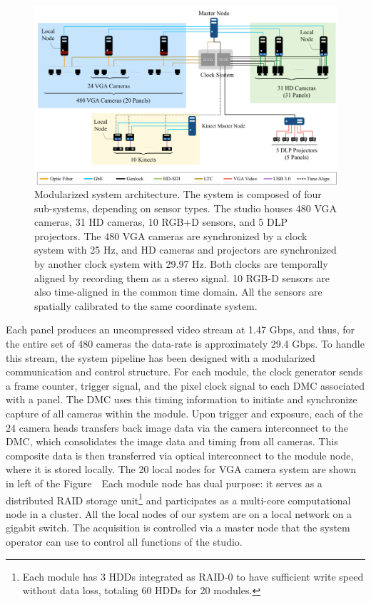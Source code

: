 \begin{figure}[t]
	\includegraphics[width=\linewidth]{fig_system/panoptic_architecture}
	\caption{Modularized system architecture. The system is composed of four sub-systems, depending on sensor types. The studio houses 480 VGA cameras, 31 HD cameras, 10 RGB+D sensors, and 5 DLP projectors. The 480 VGA cameras are synchronized by a clock system with 25 Hz, and HD cameras and projectors are synchronized by another clock system with 29.97 Hz. Both clocks are temporally aligned by recording them as a stereo signal. 10 RGB-D sensors are also time-aligned in the common time domain. All the sensors are spatially calibrated to the same coordinate system.}
	\label{fig:dome_architecture}
\end{figure}

Each panel produces an uncompressed video stream at 1.47 Gbps, and thus, for the entire set of 480 cameras the data-rate is approximately 29.4 Gbps. To handle this stream, the system pipeline has been designed with a modularized communication and control structure. For each module, the clock generator sends a frame counter, trigger signal, and the pixel clock signal to each DMC associated with a panel. The DMC uses this timing information to initiate and synchronize capture of all cameras within the module. Upon trigger and exposure, each of the 24 camera heads transfers back image data via the camera interconnect to the DMC, which consolidates the image data and timing from all cameras. This composite data is then transferred via optical interconnect to the module node, where it is stored locally. The 20 local nodes for VGA camera system are shown in left of the Figure~\ Each module node has dual purpose: it serves as a distributed RAID storage unit\footnote{Each module has 3 HDDs integrated as RAID-0 to have sufficient write speed without data loss, totaling 60 HDDs for 20 modules.} and participates as a multi-core computational node in a cluster. All the local nodes of our system are on a local network on a gigabit switch. The acquisition is controlled via a master node that the system operator can use to control all functions of the studio.



